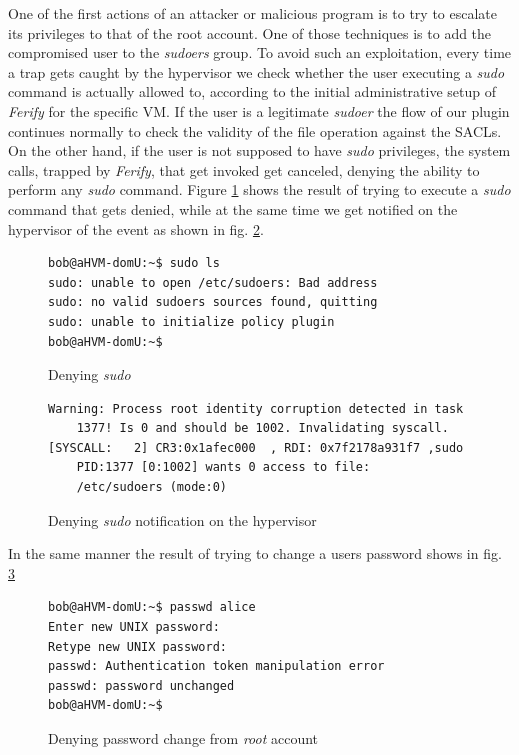 \par One of the first actions of an attacker or malicious program is to try to escalate its privileges to that of the root account. One of those techniques is to add the compromised user to the \emph{sudoers} group. To avoid such an exploitation, every time a trap gets caught by the hypervisor we check whether the user executing a \emph{sudo} command is actually allowed to, according to the initial administrative setup of \emph{Ferify} for the specific \ac{VM}. If the user is a legitimate \emph{sudoer} the flow of our plugin continues normally to check the validity of the file operation against the \acp{SACL}. On the other hand, if the user is not supposed to have \emph{sudo} privileges, the system calls, trapped by \emph{Ferify}, that get invoked get canceled, denying the ability to perform any \emph{sudo} command. Figure \ref{fig:sudo_deny} shows the result of trying to execute a \emph{sudo} command that gets denied, while at the same time we get notified on the hypervisor of the event as shown in fig. \ref{fig:sudo_deny_not}.

\begin{figure}[ht]
	\centering
	\scriptsize{\selectfont 
		\begin{lstlisting}
bob@aHVM-domU:~$ sudo ls
sudo: unable to open /etc/sudoers: Bad address
sudo: no valid sudoers sources found, quitting
sudo: unable to initialize policy plugin
bob@aHVM-domU:~$
		\end{lstlisting}}
	\caption{Denying \emph{sudo}}
	\label{fig:sudo_deny}
\end{figure}

\begin{figure}[ht]
	\centering
	\scriptsize{\selectfont 
		\begin{lstlisting}
Warning: Process root identity corruption detected in task 
	1377! Is 0 and should be 1002. Invalidating syscall.
[SYSCALL:   2] CR3:0x1afec000  , RDI: 0x7f2178a931f7 ,sudo 
	PID:1377 [0:1002] wants 0 access to file: 
	/etc/sudoers (mode:0)
		\end{lstlisting}}
	\caption{Denying \emph{sudo} notification on the hypervisor}
	\label{fig:sudo_deny_not}
\end{figure}

\par In the same manner the result of trying to change a users password shows in fig. \ref{fig:passwd_deny}

\begin{figure}[ht]
	\centering
	\scriptsize{\selectfont 
		\begin{lstlisting}
bob@aHVM-domU:~$ passwd alice
Enter new UNIX password:
Retype new UNIX password:
passwd: Authentication token manipulation error
passwd: password unchanged
bob@aHVM-domU:~$
		\end{lstlisting}}
	\caption{Denying password change from \emph{root} account}
	\label{fig:passwd_deny}
\end{figure}


